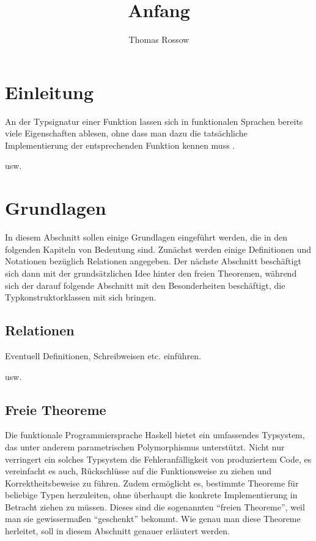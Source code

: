 \documentclass[11pt]{article} %
\title{Anfang}
\author{Thomas Rossow}
\begin{document}
\maketitle

\section{Einleitung}

An der Typsignatur einer Funktion lassen sich in funktionalen Sprachen bereits viele Eigenschaften ablesen, ohne dass man dazu die
tatsächliche Implementierung der entsprechenden Funktion kennen muss \cite{wadler}.

usw.

\section{Grundlagen}

In diesem Abschnitt sollen einige Grundlagen eingeführt werden, die in den folgenden Kapiteln von Bedeutung sind. Zunächst werden
einige Definitionen und Notationen bezüglich Relationen angegeben. Der nächste Abschnitt beschäftigt sich dann mit der
grundsätzlichen Idee hinter den freien Theoremen, während sich der darauf folgende Abschnitt mit den Besonderheiten beschäftigt,
die Typkonstruktorklassen mit sich bringen.

\subsection{Relationen}

Eventuell Definitionen, Schreibweisen etc. einführen.

usw.

\subsection{Freie Theoreme}
\label{sec:freie-theoreme}


Die funktionale Programmiersprache Haskell bietet ein umfassendes Typsystem, das unter anderem parametrischen Polymorphismus
unterstützt. Nicht nur verringert ein solches Typsystem die Fehleranfälligkeit von produziertem Code, es vereinfacht es auch,
Rückschlüsse auf die Funktionsweise zu ziehen und Korrektheitsbeweise zu führen.
Zudem ermöglicht es, bestimmte Theoreme für beliebige Typen herzuleiten, ohne überhaupt die konkrete Implementierung
in Betracht ziehen zu müssen. Dieses sind die sogenannten ``freien Theoreme'', weil man sie gewissermaßen ``geschenkt''
bekommt. Wie genau man diese Theoreme herleitet, soll in diesem Abschnitt genauer erläutert werden.
\end{document}
